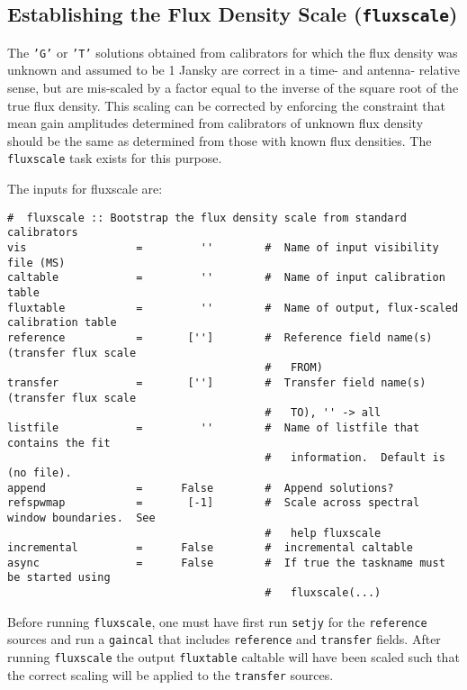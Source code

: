 \subsection{Establishing the Flux Density Scale ({\tt fluxscale}) }
\label{section:cal.solve.fluxscale}

The {\tt 'G'} or {\tt 'T'} solutions obtained from calibrators for
which the flux 
density was unknown and assumed to be 1 Jansky are correct in a time- and
antenna- relative sense, but are mis-scaled by a factor equal to the
inverse of the square root of the true flux density.  This scaling can
be corrected by enforcing the constraint that mean gain amplitudes
determined from calibrators of unknown flux density should be the same
as determined from those with known flux densities.  The {\tt
fluxscale} task exists for this purpose.  

The inputs for fluxscale are:
\small
\begin{verbatim}
#  fluxscale :: Bootstrap the flux density scale from standard calibrators
vis                 =         ''        #  Name of input visibility file (MS)
caltable            =         ''        #  Name of input calibration table
fluxtable           =         ''        #  Name of output, flux-scaled calibration table
reference           =       ['']        #  Reference field name(s) (transfer flux scale
                                        #   FROM)
transfer            =       ['']        #  Transfer field name(s) (transfer flux scale
                                        #   TO), '' -> all
listfile            =         ''        #  Name of listfile that contains the fit
                                        #   information.  Default is  (no file).
append              =      False        #  Append solutions?
refspwmap           =       [-1]        #  Scale across spectral window boundaries.  See
                                        #   help fluxscale
incremental         =      False        #  incremental caltable
async               =      False        #  If true the taskname must be started using
                                        #   fluxscale(...)
\end{verbatim}
\normalsize

Before running {\tt fluxscale}, one must have first run {\tt setjy} for the
{\tt reference} sources and run a {\tt gaincal} that includes {\tt reference}
and {\tt transfer} fields.  After running {\tt fluxscale} the output
{\tt fluxtable} caltable will have been scaled such that the correct
scaling will be applied to the {\tt transfer} sources.

